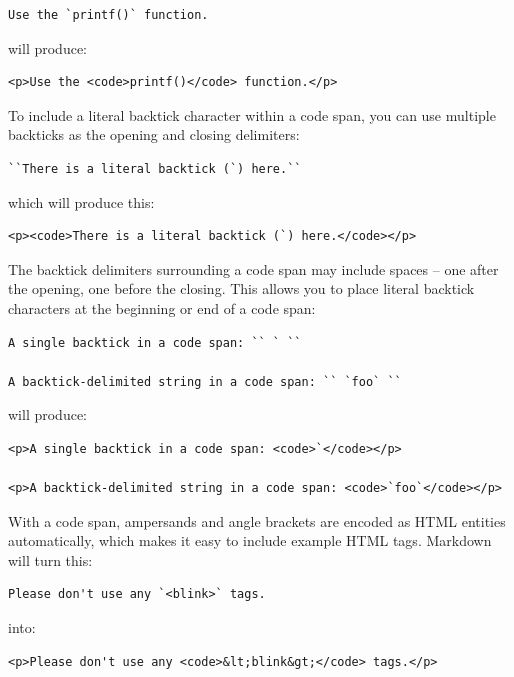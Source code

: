 \begin{verbatim}
Use the `printf()` function.
\end{verbatim}

will produce:

\begin{verbatim}
<p>Use the <code>printf()</code> function.</p>
\end{verbatim}

To include a literal backtick character within a code span, you can use
multiple backticks as the opening and closing delimiters:

\begin{verbatim}
``There is a literal backtick (`) here.``
\end{verbatim}

which will produce this:

\begin{verbatim}
<p><code>There is a literal backtick (`) here.</code></p>
\end{verbatim}

The backtick delimiters surrounding a code span may include spaces --
one after the opening, one before the closing. This allows you to place
literal backtick characters at the beginning or end of a code span:

\begin{verbatim}
A single backtick in a code span: `` ` ``

A backtick-delimited string in a code span: `` `foo` ``
\end{verbatim}

will produce:

\begin{verbatim}
<p>A single backtick in a code span: <code>`</code></p>

<p>A backtick-delimited string in a code span: <code>`foo`</code></p>
\end{verbatim}

With a code span, ampersands and angle brackets are encoded as HTML
entities automatically, which makes it easy to include example HTML
tags. Markdown will turn this:

\begin{verbatim}
Please don't use any `<blink>` tags.
\end{verbatim}

into:

\begin{verbatim}
<p>Please don't use any <code>&lt;blink&gt;</code> tags.</p>
\end{verbatim}


